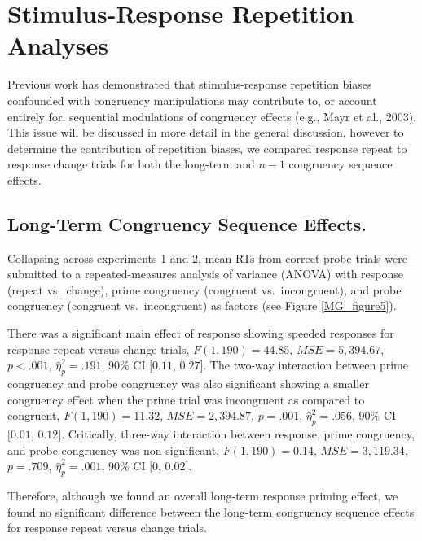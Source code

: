 \documentclass[]{DissertateCUNY}
\begin{document}
\hypertarget{stimulus-response-repetition-analyses}{%
\section{Stimulus-Response Repetition
Analyses}\label{stimulus-response-repetition-analyses}}

Previous work has demonstrated that stimulus-response repetition biases
confounded with congruency manipulations may contribute to, or account
entirely for, sequential modulations of congruency effects (e.g., Mayr
et al., 2003). This issue will be discussed in more detail in the
general discussion, however to determine the contribution of repetition
biases, we compared response repeat to response change trials for both
the long-term and \(n-1\) congruency sequence effects.

\hypertarget{long-term-congruency-sequence-effects.-4}{%
\subsection{Long-Term Congruency Sequence
Effects.}\label{long-term-congruency-sequence-effects.-4}}

Collapsing across experiments 1 and 2, mean RTs from correct probe
trials were submitted to a repeated-measures analysis of variance
(ANOVA) with response (repeat vs.~change), prime congruency (congruent
vs.~incongruent), and probe congruency (congruent vs.~incongruent) as
factors (see Figure \ref{MG_figure5}).

There was a significant main effect of response showing speeded
responses for response repeat versus change trials,
\(F(1, 190) = 44.85\), \(\mathit{MSE} = 5,394.67\), \(p < .001\),
\(\hat{\eta}^2_p = .191\), 90\% CI \([0.11\), \(0.27]\). The two-way
interaction between prime congruency and probe congruency was also
significant showing a smaller congruency effect when the prime trial was
incongruent as compared to congruent, \(F(1, 190) = 11.32\),
\(\mathit{MSE} = 2,394.87\), \(p = .001\), \(\hat{\eta}^2_p = .056\),
90\% CI \([0.01\), \(0.12]\). Critically, three-way interaction between
response, prime congruency, and probe congruency was non-significant,
\(F(1, 190) = 0.14\), \(\mathit{MSE} = 3,119.34\), \(p = .709\),
\(\hat{\eta}^2_p = .001\), 90\% CI \([0\), \(0.02]\).

Therefore, although we found an overall long-term response priming
effect, we found no significant difference between the long-term
congruency sequence effects for response repeat versus change trials.
\end{document}
